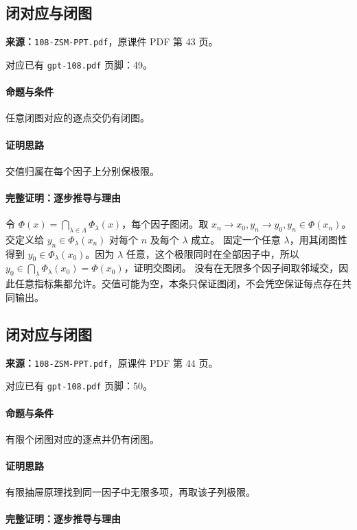 \clearpage\subsection{闭对应与闭图}
\textbf{来源：}\texttt{108-ZSM-PPT.pdf}，原课件 PDF 第 43 页。\par
对应已有 \texttt{gpt-108.pdf} 页脚：49。\par
\paragraph{命题与条件}任意闭图对应的逐点交仍有闭图。
\paragraph{证明思路}交值归属在每个因子上分别保极限。
\paragraph{完整证明：逐步推导与理由}

令 $\Phi(x)=\bigcap_{\lambda\in\Lambda}\Phi_\lambda(x)$，每个因子图闭。取 $x_n\to x_0,y_n\to y_0,y_n\in\Phi(x_n)$。交定义给 $y_n\in\Phi_\lambda(x_n)$ 对每个 $n$ 及每个 $\lambda$ 成立。
固定一个任意 $\lambda$，用其闭图性得到 $y_0\in\Phi_\lambda(x_0)$。因为 $\lambda$ 任意，这个极限同时在全部因子中，所以 $y_0\in\bigcap_\lambda\Phi_\lambda(x_0)=\Phi(x_0)$，证明交图闭。
没有在无限多个因子间取邻域交，因此任意指标集都允许。交值可能为空，本条只保证图闭，不会凭空保证每点存在共同输出。

\clearpage\subsection{闭对应与闭图}
\textbf{来源：}\texttt{108-ZSM-PPT.pdf}，原课件 PDF 第 44 页。\par
对应已有 \texttt{gpt-108.pdf} 页脚：50。\par
\paragraph{命题与条件}有限个闭图对应的逐点并仍有闭图。
\paragraph{证明思路}有限抽屉原理找到同一因子中无限多项，再取该子列极限。
\paragraph{完整证明：逐步推导与理由}

